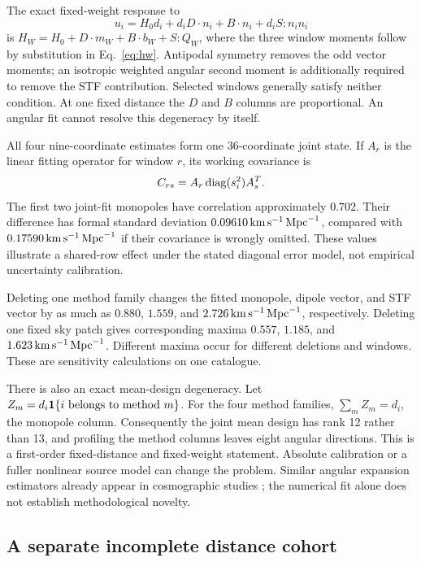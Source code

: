 The exact fixed-weight response to
\begin{equation}
 u_i=H_0d_i+d_iD\cdot n_i+B\cdot n_i+d_iS:n_in_i
\end{equation}
is $H_W=H_0+D\cdot m_W+B\cdot b_W+S:Q_W$, where the three window moments follow by substitution in Eq.~\eqref{eq:hw}. Antipodal symmetry removes the odd vector moments; an isotropic weighted angular second moment is additionally required to remove the STF contribution. Selected windows generally satisfy neither condition. At one fixed distance the $D$ and $B$ columns are proportional. An angular fit cannot resolve this degeneracy by itself.

All four nine-coordinate estimates form one 36-coordinate joint state. If $A_r$ is the linear fitting operator for window $r$, its working covariance is
\begin{equation}
 C_{rs}=A_r\operatorname{diag}(s_i^2)A_s^T.
 \label{eq:sharedrowcov}
\end{equation}
The first two joint-fit monopoles have correlation approximately $0.702$. Their difference has formal standard deviation $0.09610\,\mathrm{km}\,\mathrm{s}^{-1}\,\mathrm{Mpc}^{-1}$, compared with $0.17590\,\mathrm{km}\,\mathrm{s}^{-1}\,\mathrm{Mpc}^{-1}$ if their covariance is wrongly omitted. These values illustrate a shared-row effect under the stated diagonal error model, not empirical uncertainty calibration.

Deleting one method family changes the fitted monopole, dipole vector, and STF vector by as much as $0.880$, $1.559$, and $2.726\,\mathrm{km}\,\mathrm{s}^{-1}\,\mathrm{Mpc}^{-1}$, respectively. Deleting one fixed sky patch gives corresponding maxima $0.557$, $1.185$, and $1.623\,\mathrm{km}\,\mathrm{s}^{-1}\,\mathrm{Mpc}^{-1}$. Different maxima occur for different deletions and windows. These are sensitivity calculations on one catalogue.

There is also an exact mean-design degeneracy. Let $Z_m=d_i\mathbf 1\{i\hbox{ belongs to method }m\}$. For the four method families, $\sum_m Z_m=d_i$, the monopole column. Consequently the joint mean design has rank 12 rather than 13, and profiling the method columns leaves eight angular directions. This is a first-order fixed-distance and fixed-weight statement. Absolute calibration or a fuller nonlinear source model can change the problem. Similar angular expansion estimators already appear in cosmographic studies \cite{Kalbouneh2026}; the numerical fit alone does not establish methodological novelty.

\subsection{A separate incomplete distance cohort}

